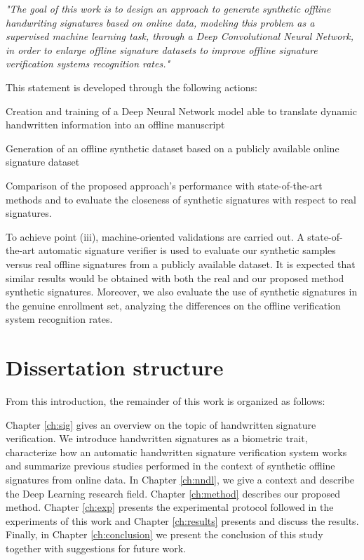 \textit{"The goal of this work is to design an approach to generate synthetic offline handwriting signatures based on online data, modeling this problem as a supervised machine learning task, through a Deep Convolutional Neural Network, in order to enlarge offline signature datasets to improve offline signature verification systems recognition rates."}

This statement is developed through the following actions:
\begin{inlinelist}
\item Creation and training of a Deep Neural Network model able to translate dynamic handwritten information into an offline manuscript
\item Generation of an offline synthetic dataset based on a publicly available online signature dataset
\item Comparison of the proposed approach’s performance with state-of-the-art methods and to evaluate the closeness of synthetic signatures with respect to real signatures. 
\end{inlinelist}

To achieve point (iii), machine-oriented validations are carried out. A state-of-the-art automatic signature verifier is used to evaluate our synthetic samples versus real offline signatures from a publicly available dataset. It is expected that similar results would be obtained with both the real and our proposed method synthetic signatures. Moreover, we also evaluate the use of synthetic signatures in the genuine enrollment set, analyzing the differences on the offline verification system recognition rates. 

\section{Dissertation structure}
From this introduction, the remainder of this work is organized as follows:

Chapter \ref{ch:sig} gives an overview on the topic of handwritten signature verification. We introduce handwritten signatures as a biometric trait, characterize how an automatic handwritten signature verification system works and summarize previous studies performed in the context of synthetic offline signatures from online data. In Chapter \ref{ch:nndl}, we give a context and describe the  Deep Learning research field. Chapter \ref{ch:method} describes our proposed method. Chapter \ref{ch:exp} presents the experimental protocol followed in the experiments of this work and Chapter \ref{ch:results} presents and discuss the results. Finally, in Chapter \ref{ch:conclusion} we present the conclusion of this study together with suggestions for future work.



